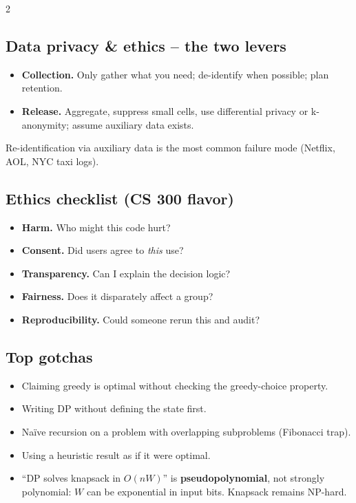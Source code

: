 \documentclass[10pt]{article}
\begin{document}
\begin{multicols}{2}
\subsection*{Data privacy \& ethics -- the two levers}
\begin{itemize}
    \item \textbf{Collection.} Only gather what you need; de-identify
    when possible; plan retention.
    \item \textbf{Release.} Aggregate, suppress small cells, use
    differential privacy or k-anonymity; assume auxiliary data exists.
\end{itemize}
Re-identification via auxiliary data is the most common failure mode
(Netflix, AOL, NYC taxi logs).

\subsection*{Ethics checklist (CS 300 flavor)}
\begin{itemize}
    \item \textbf{Harm.} Who might this code hurt?
    \item \textbf{Consent.} Did users agree to \emph{this} use?
    \item \textbf{Transparency.} Can I explain the decision logic?
    \item \textbf{Fairness.} Does it disparately affect a group?
    \item \textbf{Reproducibility.} Could someone rerun this and audit?
\end{itemize}

\subsection*{Top gotchas}
\begin{itemize}
    \item Claiming greedy is optimal without checking the
    greedy-choice property.
    \item Writing DP without defining the state first.
    \item Na\"ive recursion on a problem with overlapping subproblems
    (Fibonacci trap).
    \item Using a heuristic result as if it were optimal.
    \item ``DP solves knapsack in $O(nW)$'' is \textbf{pseudopolynomial},
    not strongly polynomial: $W$ can be exponential in input bits.
    Knapsack remains NP-hard.
\end{itemize}

\end{multicols}
\end{document}
